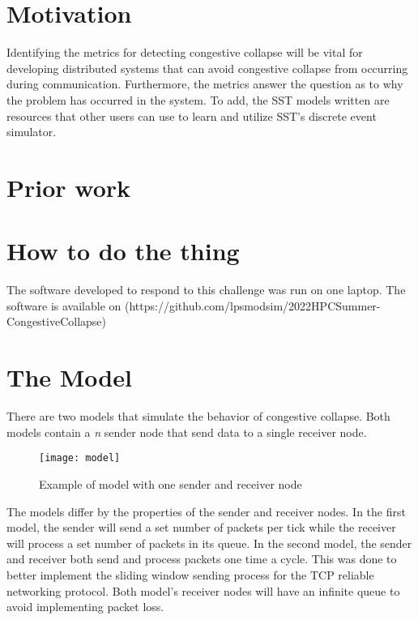 \documentclass{article}
\begin{document}
\section{Motivation} %

Identifying the metrics for detecting congestive collapse will be vital for developing distributed systems that can avoid congestive collapse from occurring during communication. Furthermore, the metrics answer the question as to why the problem has occurred in the system. To add, the SST models written are resources that other users can use to learn and utilize SST's discrete event simulator.

\section{Prior work} %


\section{How to do the thing}

The software developed to respond to this challenge was run on one laptop.
The software is available on (https://github.com/lpsmodsim/2022HPCSummer-CongestiveCollapse)

\section{The Model}

There are two models that simulate the behavior of congestive collapse.
Both models contain a \textit{n} sender node that send data to a single receiver node.

\begin{figure}[H]
	\texttt{[image: model]}
	\centering
	\caption{Example of model with one sender and receiver node}
\end{figure}

The models differ by the properties of the sender and receiver nodes.
In the first model, the sender will send a set number of packets per tick while the receiver will process a set number of packets in its queue.
In the second model, the sender and receiver both send and process packets one time a cycle. This was done to better implement the sliding window sending process for the TCP reliable networking protocol.
Both model's receiver nodes will have an infinite queue to avoid implementing packet loss.
\end{document}
